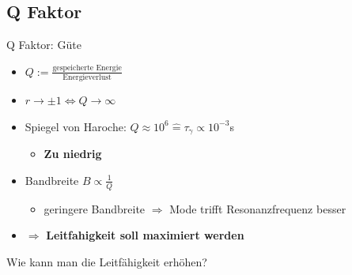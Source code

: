 \documentclass{beamer}
\begin{document}
\subsection{Q Faktor}
\begin{frame}{Q Faktor: Güte}
	\begin{itemize}
		\item $Q:=\frac{\text{gespeicherte Energie}}{\text{Energieverlust}}$
		\item $r\rightarrow \pm1\Leftrightarrow Q\rightarrow\infty$
		\item Spiegel von Haroche: $Q \approx 10^6 \hat{=} \tau_{\gamma}\propto 10^{-3}$s
		      \begin{itemize}
			      \item \textbf{Zu niedrig}
		      \end{itemize}
		\item Bandbreite $B\propto\frac{1}{Q}$
		      \begin{itemize}
			      \item geringere Bandbreite $\Rightarrow$ Mode trifft Resonanzfrequenz besser
		      \end{itemize}
		\item $\Rightarrow$ \textbf{Leitfahigkeit soll maximiert werden}

	\end{itemize}
\end{frame}
\begin{frame}
	\Large\center Wie kann man die Leitfähigkeit erhöhen?
\end{frame}
\end{document}

